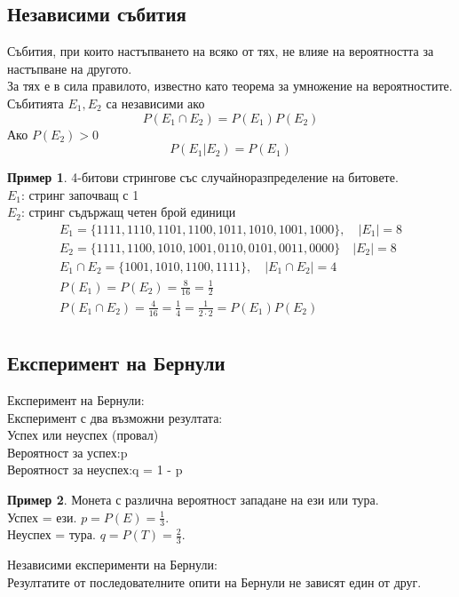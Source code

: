 \documentclass[fleqn, 12pt]{article}
\theoremstyle{definition}
\newtheorem{example}{Пример}[subsection]
\begin{document}
\subsection{Независими събития}
Събития, при които настъпването на всяко от тях, не влияе на вероятността за настъпване на другото. \\
За тях е в сила правилото, известно като теорема за умножение на вероятностите.\\
Събитията $E_1, E_2$ са независими ако
$$P(E_1 \cap E_2) = P(E_1)P(E_2)$$
Ако $P(E_2) > 0$
$$P(E_1 \vert E_2) = P(E_1)$$


\begin{example}
4-битови стрингове със случайноразпределение на битовете.\\
$E_1$: стринг започващ с 1\\
$E_2$: стринг съдържащ четен брой единици
\begin{gather*}
E_1 = \{1111,1110,1101,1100,1011,1010,1001,1000 \}, \quad |E_1| = 8\\
E_2 = \{1111,1100,1010,1001,0110,0101,0011,0000 \}\quad |E_2| = 8\\
E_1 \cap E_2 = \{ 1001,1010,1100,1111 \}, \quad |E_1 \cap E_2| = 4\\
P(E_1) = P(E_2) = \frac{8}{16} = \frac{1}{2}\\
P(E_1 \cap E_2) = \frac{4}{16} = \frac{1}{4} = \frac{1}{2 \cdot 2} = P(E_1) P(E_2)\\
\end{gather*}
\end{example}

\subsection{Експеримент на Бернули}
Експеримент на Бернули:\\
Експеримент с два възможни резултата: \\
Успех или неуспех (провал)\\
Вероятност за успех:p \\
Вероятност за неуспех:q = 1 - p

\begin{example}
Монета с различна вероятност западане на ези или тура.\\
Успех = ези. $p = P(E) = \frac{1}{3}$.\\
Неуспех = тура. $q = P(T) = \frac{2}{3}$.\\ 
\end{example}
Независими експерименти на Бернули:\\
Резултатите от последователните опити на Бернули не зависят един от друг.
\end{document}
